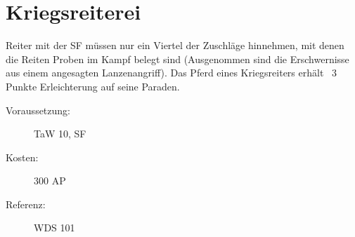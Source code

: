 \section{Kriegsreiterei}
\label{sf.kriegsreiterei}
Reiter mit der SF  müssen nur ein Viertel der Zuschläge hinnehmen, mit denen die Reiten Proben im Kampf belegt sind (Ausgenommen sind die Erschwernisse aus einem angesagten Lanzenangriff).
Das Pferd eines Kriegsreiters erhält \ 3 Punkte Erleichterung auf seine Paraden.
\begin{description}
    \item[Voraussetzung:]
        TaW  10, SF 
    \item [Kosten:]
        300 AP
    \item [Referenz:]
        WDS 101
\end{description}
